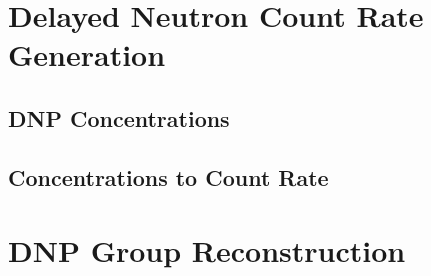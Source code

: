 %

\section{Delayed Neutron Count Rate Generation}
\label{sec:delnu-counts}



\subsection{DNP Concentrations}


\subsection{Concentrations to Count Rate}


\section{DNP Group Reconstruction}
\label{sec:delnu-groups}








